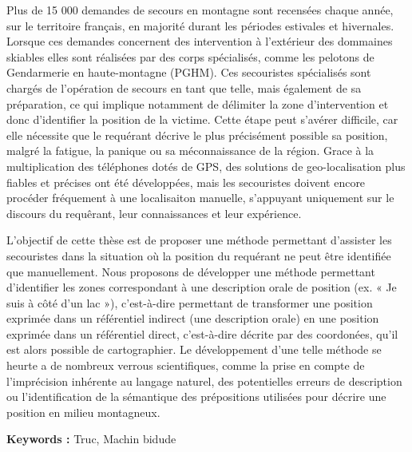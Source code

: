 Plus de 15 000 demandes de secours en montagne sont recensées chaque
année, sur le territoire français, en majorité durant les périodes
estivales et hivernales. Lorsque ces demandes concernent des
intervention à l'extérieur des dommaines skiables elles sont réalisées
par des corps spécialisés, comme les pelotons de Gendarmerie en
haute-montagne (PGHM). Ces secouristes spécialisés sont chargés de
l'opération de secours en tant que telle, mais également de sa
préparation, ce qui implique notamment de délimiter la zone
d'intervention et donc d'identifier la position de la victime. Cette
étape peut s'avérer difficile, car elle nécessite que le requérant
décrive le plus précisément possible sa position, malgré la fatigue,
la panique ou sa méconnaissance de la région. Grace à la
multiplication des téléphones dotés de GPS, des solutions de
geo-localisation plus fiables et précises ont été développées, mais
les secouristes doivent encore procéder fréquement à une localisaiton
manuelle, s'appuyant uniquement sur le discours du requêrant, leur
connaissances et leur expérience. 

L'objectif de cette thèse est de proposer une méthode permettant
d'assister les secouristes dans la situation où la position du
requérant ne peut être identifiée que manuellement. Nous proposons de
développer une méthode permettant d'identifier les zones correspondant
à une description orale de position (ex. « Je suis à côté d'un lac »),
c'est-à-dire permettant de transformer une position exprimée dans un
référentiel indirect (une description orale) en une position exprimée
dans un référentiel direct, c'est-à-dire décrite par des coordonées,
qu'il est alors possible de cartographier. Le développement d'une
telle méthode se heurte a de nombreux verrous scientifiques, comme la
prise en compte de l'imprécision inhérente au langage naturel, des
potentielles erreurs de description ou l’identification de la
sémantique des prépositions utilisées pour décrire une position en
milieu montagneux.

\noident \textbf{Keywords :} Truc, Machin bidude\par